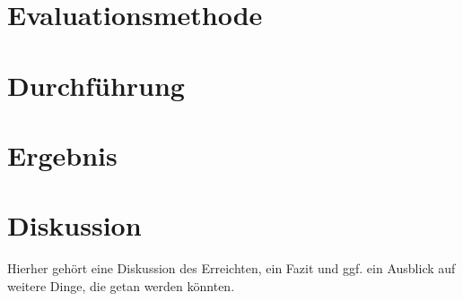 \documentclass[	12pt, 
				a4paper, 
				BCOR=10mm, %
				DIV=12, 
				parskip=half, %
				headings=small, %
				twoside, %
				ngerman,
				bibliography=totoc,index=totoc, listof=totoc,
				numbers=noendperiod
				]{scrbook} %
\theoremstyle{plain}%
\theoremstyle{definition}
\theoremstyle{remark}
\begin{document}
\section{Evaluationsmethode}
\label{sec:evaluationsmethode}
\section{Durchführung}
\label{sec:durchfuehrung}
\section{Ergebnis}
\label{sec:ergebnis}
\section{Diskussion}
\label{sec:diskussion}
Hierher gehört eine Diskussion des Erreichten, ein Fazit und ggf. ein Ausblick auf weitere Dinge, die getan
werden könnten.


\newpage
 \printbibliography	%

\appendix 				%
\end{document}
